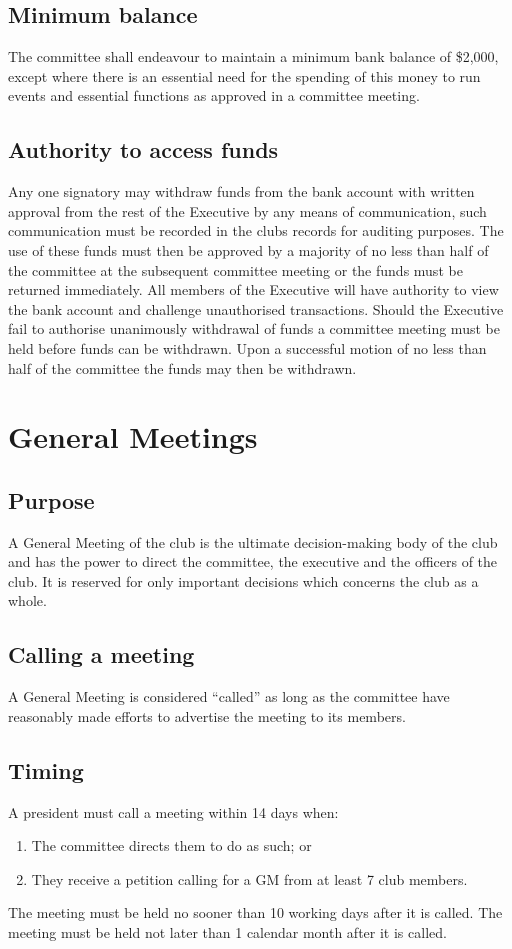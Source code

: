 \documentclass[11pt]{article}
\begin{document}
\subsection{Minimum balance}
The committee shall endeavour to maintain a minimum bank balance of \$2,000, except where there is an essential need for the spending of this money to run events and essential functions as approved in a committee meeting.
\subsection{Authority to access funds}
Any one signatory may withdraw funds from the bank account with written approval from the rest of the Executive by any means of communication, such communication must be recorded in the clubs records for auditing purposes. The use of these funds must then be approved by a majority of no less than half of the committee at the subsequent committee meeting or the funds must be returned immediately. All members of the Executive will have authority to view the bank account and challenge unauthorised transactions.
Should the Executive fail to authorise unanimously withdrawal of funds a committee meeting must be held before funds can be withdrawn. Upon a successful motion of no less than half of the committee the funds may then be withdrawn.

\section{General Meetings} \label{generalMeetings}
\subsection{Purpose}
A General Meeting of the club is the ultimate decision-making body of the club and has the power to direct the committee, the executive and the officers of the club. It is reserved for only important decisions which concerns the club as a whole.
\subsection{Calling a meeting}
A General Meeting is considered “called” as long as the committee have reasonably made efforts to advertise the meeting to its members.
\subsection{Timing}
A president must call a meeting within 14 days when:
\begin{enumerate}
    \item The committee directs them to do as such; or
    \item They receive a petition calling for a GM from at least 7 club members.
\end{enumerate}
The meeting must be held no sooner than 10 working days after it is called.
The meeting must be held not later than 1 calendar month after it is called.
\end{document}
